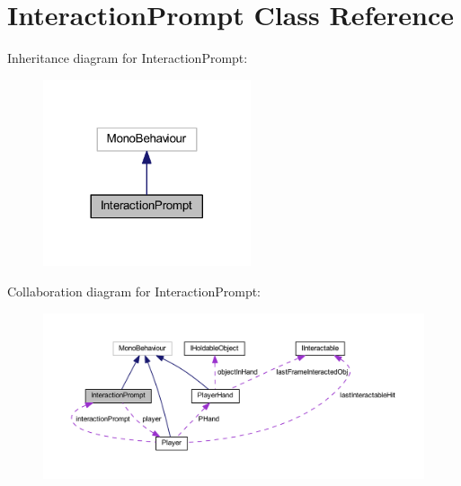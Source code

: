 \hypertarget{class_interaction_prompt}{}\section{Interaction\+Prompt Class Reference}
\label{class_interaction_prompt}


Inheritance diagram for Interaction\+Prompt\+:
\nopagebreak
\begin{figure}[H]
\begin{center}
\leavevmode
\includegraphics[width=173pt]{class_interaction_prompt__inherit__graph}
\end{center}
\end{figure}


Collaboration diagram for Interaction\+Prompt\+:
\nopagebreak
\begin{figure}[H]
\begin{center}
\leavevmode
\includegraphics[width=350pt]{class_interaction_prompt__coll__graph}
\end{center}
\end{figure}
